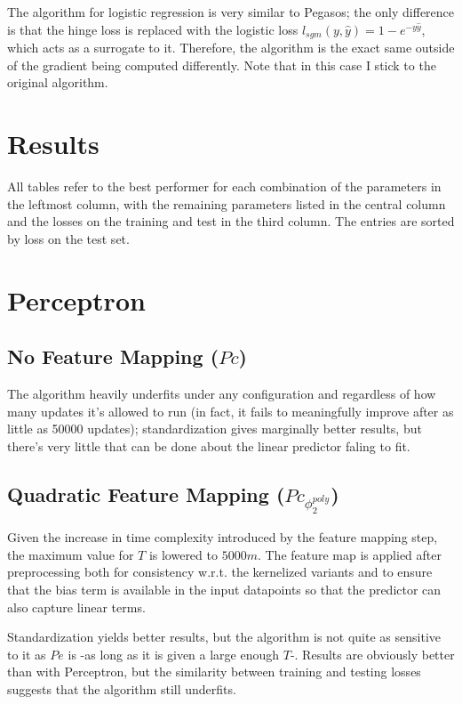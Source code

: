 The algorithm for logistic regression is very similar to Pegasos; the only difference is that the hinge loss is replaced with the logistic loss $l_{sgm}(y, \hat{y}) = 1 - e^{-y\hat{y}}$, which acts as a surrogate to it. Therefore, the algorithm is the exact same outside of the gradient being computed differently. Note that in this case I stick to the original algorithm.

\pagebreak{}

\section{Results}
All tables refer to the best performer for each combination of the parameters in the leftmost column, with the remaining parameters listed in the central column and the losses on the training and test in the third column. The entries are sorted by loss on the test set.

\pagebreak{}
\section{Perceptron}

\subsection{No Feature Mapping ($Pc$)}
The algorithm heavily underfits under any configuration and regardless of how many updates it's allowed to run (in fact, it fails to meaningfully improve after as little as 50000 updates); standardization gives marginally better results, but there's very little that can be done about the linear predictor faling to fit.



\pagebreak{}
\subsection{Quadratic Feature Mapping ($Pc_{\phi^{poly}_2}$)}
Given the increase in time complexity introduced by the feature mapping step, the maximum value for $T$ is lowered to $5000m$. The feature map is applied after preprocessing both for consistency w.r.t. the kernelized variants and to ensure that the bias term is available in the input datapoints so that the predictor can also capture linear terms.

Standardization yields better results, but the algorithm is not quite as sensitive to it as $Pe$ is -as long as it is given a large enough $T$-. Results are obviously better than with Perceptron, but the similarity between training and testing losses suggests that the algorithm still underfits.


